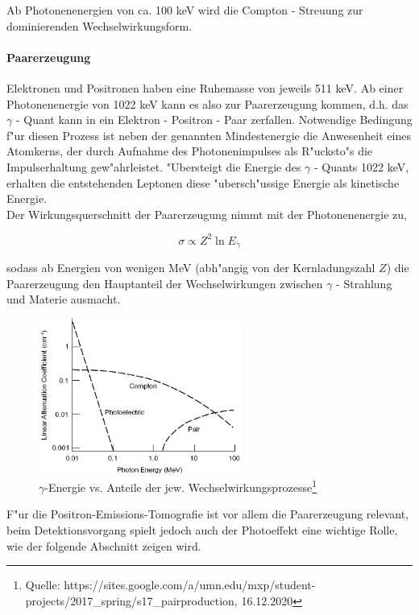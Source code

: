 \documentclass{article}
\begin{document}
Ab Photonenenergien von ca. 100 keV wird die Compton - Streuung zur dominierenden Wechselwirkungsform.


\paragraph{Paarerzeugung}

Elektronen und Positronen haben eine Ruhemasse von jeweils 511 keV. Ab einer Photonenenergie von 1022 keV kann es also zur Paarerzeugung kommen, d.h. das $\gamma$ - Quant kann in ein Elektron - Positron - Paar zerfallen. Notwendige Bedingung f"ur diesen Prozess ist neben der genannten Mindestenergie die Anwesenheit eines Atomkerns, der durch Aufnahme des Photonenimpulses als R"ucksto"s die Impulserhaltung gew"ahrleistet. "Ubersteigt die Energie des $\gamma$ - Quants 1022 keV, erhalten die entstehenden Leptonen diese "ubersch"ussige Energie als kinetische Energie.\\
Der Wirkungsquerschnitt der Paarerzeugung nimmt mit der Photonenenergie zu,

	\begin{equation}
		\sigma \propto Z^2 \ln{E_{\gamma}}
	\end{equation}

sodass ab Energien von wenigen MeV (abh"angig von der Kernladungszahl $Z$) die Paarerzeugung den Hauptanteil der Wechselwirkungen zwischen $\gamma$ - Strahlung und Materie ausmacht.


\begin{figure}[!ht]
	\centering
	\includegraphics[width=250px, totalheight=250px, keepaspectratio]{WW.PNG}
	\caption{$\gamma$-Energie vs. Anteile der jew. Wechselwirkungsprozesse\footnote{Quelle: https://sites.google.com/a/umn.edu/mxp/student-projects/2017_spring/s17_pairproduction, 16.12.2020}}
	\label{figWW}
\end{figure}

F"ur die Positron-Emissions-Tomografie ist vor allem die Paarerzeugung relevant, beim Detektionsvorgang spielt jedoch auch der Photoeffekt eine wichtige Rolle, wie der folgende Abschnitt zeigen wird.
\end{document}
